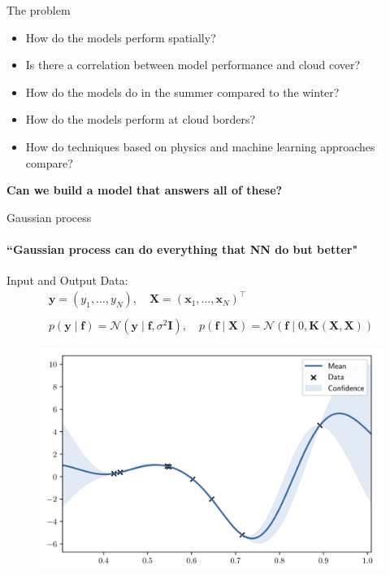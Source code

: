\documentclass{beamer}
\begin{document}
\begin{frame}{The problem}
	\begin{itemize}
		\item How do the models perform spatially?
		\item Is there a correlation between model performance and cloud cover?
		\item How do the models do in the summer compared to the winter?
		\item How do the models perform at cloud borders?
		\item How do techniques based on physics and machine learning approaches compare?
	\end{itemize}

\bigskip
\centering
\textbf{Can we build a model that answers all of these?}

\end{frame}


\begin{frame}[fragile]{Gaussian process}
\framesubtitle{``Gaussian process can do everything that NN do but better"}
Input and Output Data:
\begin{equation*}
\begin{array}{c}
	\mathbf{y}=\left(y_{1}, \ldots, y_{N}\right), \quad \mathbf{X}=\left(\mathbf{x}_{1}, \ldots, \mathbf{x}_{N}\right)^{\top} \\\\
	p(\mathbf{y} \mid \mathbf{f})=\mathcal{N}\left(\mathbf{y} \mid \mathbf{f}, \sigma^{2} \mathbf{I}\right), \quad p(\mathbf{f} \mid \mathbf{X})=\mathcal{N}(\mathbf{f} \mid 0, \mathbf{K}(\mathbf{X}, \mathbf{X}))
\end{array}
\end{equation*}

\begin{figure}
	\centering
	\includegraphics[width=0.5\linewidth]{images/figure_11}
	\label{fig:figure11}
\end{figure}
\end{frame}
\end{document}
